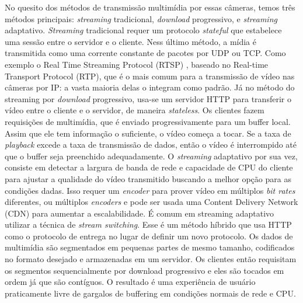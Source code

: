 \documentclass[12pt, %
openright, 
oneside, %
a4paper,    %
brazil]{facom-ufu-abntex2}
\begin{document}
No quesito dos métodos de transmissão multimídia por essas câmeras, temos três
métodos principais: \textit{\foreignlanguage{english}{streaming}} tradicional,
\textit{\foreignlanguage{english}{download}} progressivo, e
\textit{\foreignlanguage{english}{streaming}} adaptativo.
\textit{\foreignlanguage{english}{Streaming}} tradicional requer um protocolo
\textit{\foreignlanguage{english}{stateful}} que estabelece uma sessão entre o
servidor e o cliente. Ness último método, a mídia é transmitida como uma
corrente constante de pacotes por UDP ou TCP. Como exemplo o Real Time
Streaming Protocol (RTSP) , baseado no Real-time Transport Protocol (RTP), que
é o mais comum para a transmissão de vídeo nas câmeras por IP: a vasta maioria
delas o integram como padrão. Já no método do streaming por
\textit{\foreignlanguage{english}{download}} progressivo, usa-se um servidor
HTTP para transferir o vídeo entre o cliente e o servidor, de maneira
\textit{\foreignlanguage{english}{stateless}}. Os clientes fazem requisições de
multimídia, que é enviado progressivamente para um buffer local. Assim que ele
tem informação o suficiente, o vídeo começa a tocar. Se a taxa de
\textit{\foreignlanguage{english}{playback}} excede a taxa de transmissão de
dados, então o vídeo é interrompido até que o buffer seja preenchido
adequadamente. O \textit{\foreignlanguage{english}{streaming}} adaptativo por
sua vez, consiste em detectar a largura de banda de rede e capacidade de CPU do
cliente para ajustar a qualidade do vídeo transmitido buscando a melhor opção
para as condições dadas. Isso requer um
\textit{\foreignlanguage{english}{encoder}} para prover vídeo em múltiplos
\textit{\foreignlanguage{english}{bit rates}} diferentes, ou múltiplos
\textit{\foreignlanguage{english}{encoders}} e pode ser usada uma Content
Delivery Network (CDN) para aumentar a escalabilidade. É comum em streaming
adaptativo utilizar a técnica de \textit{\foreignlanguage{english}{stream
		switching}}. Esse é um método híbrido que usa HTTP como o protocolo de entrega
no lugar de definir um novo protocolo. Os dados de multimídia são segmentados
em pequenas partes de mesmo tamanho, codificados no formato desejado e
armazenadas em um servidor. Os clientes então requisitam os segmentos
sequencialmente por download progressivo e eles são tocados em ordem já que são
contíguos. O resultado é uma experiência de usuário praticamente livre de
gargalos de buffering em condições normais de rede e CPU.

\end{document}
